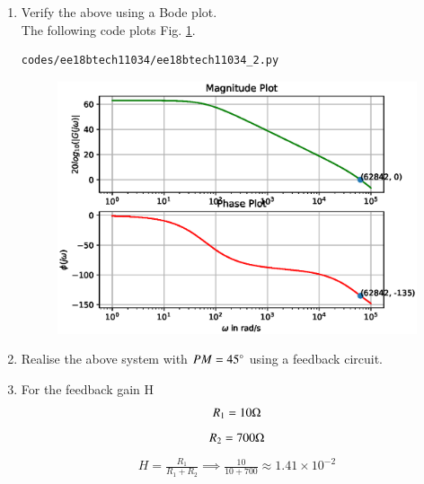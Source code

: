 \begin{enumerate}[label=\arabic*.,ref=\theenumi]
\item Verify the above using a Bode plot. 
\\
\solution 
The following code plots  Fig. \ref{fig:ee18btech11034_2}.
%
\begin{lstlisting}
codes/ee18btech11034/ee18btech11034_2.py
\end{lstlisting}
%
\begin{figure}[!h]
\centering
\includegraphics[width=\columnwidth]{./figs/ee18btech11034/ee18btech11034_2.eps}
\caption{}
\label{fig:ee18btech11034_2}
\end{figure}
\item Realise the above system with $PM = 45 \degree$ using a feedback circuit.\\
\solution
\begin{figure}[ht!]
	\begin{center}
		\resizebox{\columnwidth}{!}{}
	\end{center}
	\caption{}
	\label{fig:ee18btech11034_figd}
\end{figure}

\item For the feedback gain H\\
\solution
\begin{align}
    R_{1} = 10\ohm
\end{align}
\begin{align}
    R_{2} = 700\ohm
\end{align}
\begin{align}
    H = \frac{R_{1}}{R_{1}+R_{2}} 
    \implies \frac{10}{10+700} \approx 1.41 \times 10^{-2}
\end{align}


\end{enumerate}
